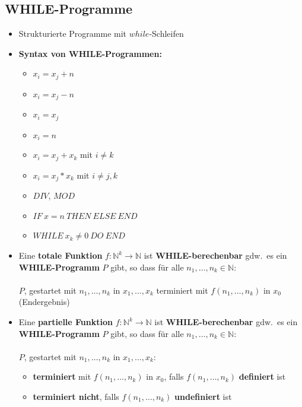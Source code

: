 \documentclass[ieeetran]{article}
\begin{document}
\subsection{WHILE-Programme} %
\label{sub:wHILE_programme}

\begin{itemize}
  \item Strukturierte Programme mit $while$-Schleifen
\item \textbf{Syntax von WHILE-Programmen:}
	\begin{itemize}
	\item $x_i = x_j + n$
		\item $x_i = x_j - n$
		
		\item $x_i = x_j$
	\item $x_i = n$
	\item $x_i = x_j + x_k$ mit $i \neq k$
\item $x_i = x_j * x_k$ mit $i \neq j,k$
\item $DIV$, $MOD$
	\item $IF \  x = n \ THEN \ ELSE  \ END$
	\item $WHILE \  x_k \neq 0 \ DO \ END$

\end{itemize}
\item Eine \textbf{totale Funktion} $f:\mathbb{N}^k \rightarrow \mathbb{N}$ ist \textbf{WHILE-berechenbar} gdw.\ es ein \textbf{WHILE-Programm} $P$ gibt, so dass für alle $n_1, \ldots,n_k \in \mathbb{N}$:
\\\\ $P$, gestartet mit $n_1, \ldots, n_k$ in $x_1, \ldots, x_k$ terminiert mit $f(n_1, \ldots, n_k)$ in $x_0$ (Endergebnis)

\item Eine \textbf{partielle Funktion} $f:\mathbb{N}^k \rightarrow \mathbb{N}$ ist \textbf{WHILE-berechenbar} gdw.\ es ein \textbf{WHILE-Programm} $P$ gibt, so dass für alle $n_1, \ldots,n_k \in \mathbb{N}$:
\\\\ $P$, gestartet mit $n_1, \ldots, n_k$ in $x_1, \ldots, x_k$:
\begin{itemize}
  \item \textbf{terminiert} mit $f(n_1, \ldots, n_k)$ in $x_0$, falls $f(n_1, \ldots, n_k)$ \textbf{definiert} ist
\item \textbf{terminiert nicht}, falls $f(n_1, \ldots, n_k)$ \textbf{undefiniert} ist
\end{itemize}


\end{itemize}
\end{document}
